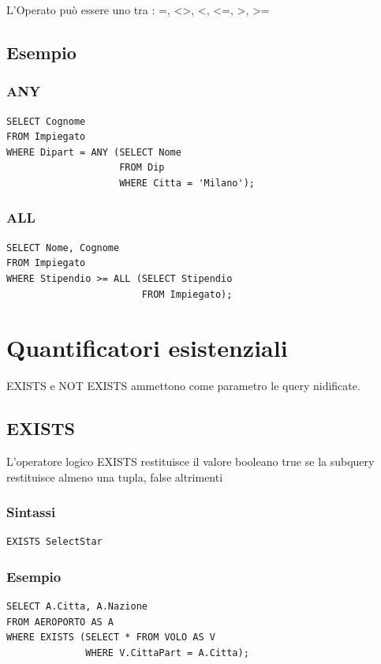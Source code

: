 L'Operato può essere uno tra : =, <>, <, <=, >, >=

\subsection{Esempio}
\subsubsection{ANY}
\begin{lstlisting}[language=sql_generic]
SELECT Cognome  
FROM Impiegato 
WHERE Dipart = ANY (SELECT Nome
                    FROM Dip            
                    WHERE Citta = 'Milano');
\end{lstlisting}

\subsubsection{ALL}
\begin{lstlisting}[language=sql_generic]
SELECT Nome, Cognome 
FROM Impiegato 
WHERE Stipendio >= ALL (SELECT Stipendio 
                        FROM Impiegato);
\end{lstlisting}

\section{Quantificatori esistenziali}
EXISTS e NOT EXISTS ammettono come parametro le query nidificate.

\subsection{EXISTS}
L'operatore logico EXISTS restituisce il valore booleano true se la subquery restituisce almeno una tupla, false altrimenti

\subsubsection{Sintassi}
\begin{lstlisting}[language=sql_generic]
EXISTS SelectStar
\end{lstlisting}

\subsubsection{Esempio}
\begin{lstlisting}[language=sql_generic]
SELECT A.Citta, A.Nazione
FROM AEROPORTO AS A
WHERE EXISTS (SELECT * FROM VOLO AS V 
              WHERE V.CittaPart = A.Citta);
\end{lstlisting}


